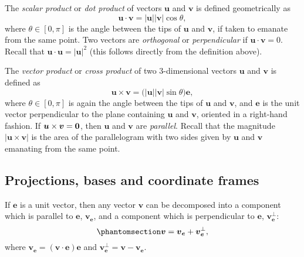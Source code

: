 \documentclass[
  letterpaper,
  DIV=11,
  numbers=noendperiod]{scrreprt}
\theoremstyle{plain}
\theoremstyle{remark}
\begin{document}
The \emph{scalar product} or \emph{dot product} of vectors
\({\boldsymbol{u}}\) and \({\boldsymbol{v}}\) is defined geometrically
as
\[{\boldsymbol{u}}\cdot {\boldsymbol{v}}= |{\boldsymbol{u}}| |{\boldsymbol{v}}| \cos \theta,\]
where \(\theta\in[0,\pi]\) is the angle between the tips of
\({\boldsymbol{u}}\) and \({\boldsymbol{v}}\), if taken to emanate from
the same point. Two vectors are \emph{orthogonal} or
\emph{perpendicular} if \({\boldsymbol{u}}\cdot{\boldsymbol{v}}= 0\).
Recall that
\({\boldsymbol{u}}\cdot {\boldsymbol{u}}= |{\boldsymbol{u}}|^2\) (this
follows directly from the definition above).

The \emph{vector product} or \emph{cross product} of two 3-dimensional
vectors \({\boldsymbol{u}}\) and \({\boldsymbol{v}}\) is defined as
\[{\boldsymbol{u}}\times {\boldsymbol{v}}= \big(|{\boldsymbol{u}}| |{\boldsymbol{v}}| \sin \theta\big){\boldsymbol{e}},\]
where \(\theta\in[0,\pi]\) is again the angle between the tips of
\({\boldsymbol{u}}\) and \({\boldsymbol{v}}\), and \({\boldsymbol{e}}\)
is the unit vector perpendicular to the plane containing
\({\boldsymbol{u}}\) and \({\boldsymbol{v}}\), oriented in a right-hand
fashion. If \({\boldsymbol{u}}\times{\boldsymbol{v}}=\bf0\), then
\({\boldsymbol{u}}\) and \({\boldsymbol{v}}\) are \emph{parallel}.
Recall that the magnitude \(|{\boldsymbol{u}}\times{\boldsymbol{v}}|\)
is the area of the parallelogram with two sides given by
\({\boldsymbol{u}}\) and \({\boldsymbol{v}}\) emanating from the same
point.

\subsection{Projections, bases and coordinate
frames}\label{projections-bases-and-coordinate-frames}

If \({\boldsymbol{e}}\) is a unit vector, then any vector
\({\boldsymbol{v}}\) can be decomposed into a component which is
parallel to \({\boldsymbol{e}}\),
\({\boldsymbol{v}}_{{\boldsymbol{e}}}\), and a component which is
perpendicular to \({\boldsymbol{e}}\),
\({\boldsymbol{v}}_{\boldsymbol{e}}^\perp\):
\begin{equation}\phantomsection\label{eq-orthogonalprojection}{
{\boldsymbol{v}}= {\boldsymbol{v}}_{{\boldsymbol{e}}}+{\boldsymbol{v}}_{{\boldsymbol{e}}}^\perp,
}\end{equation} where
\({\boldsymbol{v}}_{{\boldsymbol{e}}} = ({\boldsymbol{v}}\cdot {\boldsymbol{e}}){\boldsymbol{e}}\)
and
\({\boldsymbol{v}}_{{\boldsymbol{e}}}^\perp= {\boldsymbol{v}}-{\boldsymbol{v}}_{{\boldsymbol{e}}}.\)
\end{document}
